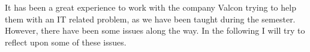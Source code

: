 It has been a great experience to work with the company Valcon trying to help them with an IT related problem, as we have been taught during the semester.
However, there have been some issues along the way.
In the following I will try to reflect upon some of these issues.